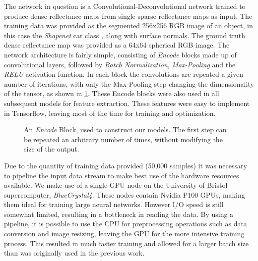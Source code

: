 \documentclass[ %
                    author={Gavin Parker},
                supervisor={Dr. Neill Campbell},
                    degree={MEng},
                     title={Deep Learning for Illumination Estimation from Stereo Images},
                  subtitle={},
                      type={Research},
                      year={2018} ]{dissertation}
\begin{document}
The network in question is a Convolutional-Deconvolutional network trained to produce dense reflectance maps from single sparse reflectance maps as input. The training data was provided as the segmented 256x256 RGB image of an object, in this case the \textit{Shapenet} car class \cite{DBLP:journals/corr/ChangFGHHLSSSSX15}, along with surface normals. The ground truth dense reflectance map was provided as a 64x64 spherical RGB image.
\newline
The network architecture is fairly simple, consisting of \textit{Encode} blocks made up of convolutional layers, followed by \textit{Batch Normalization}, \textit{Max-Pooling} and the \textit{RELU} activation function. In each block the convolutions are repeated a given number of iterations, with only the Max-Pooling step changing the dimensionality of the tensor, as shown in \ref{fig:encode}. These Encode blocks were also used in all subsequent models for feature extraction. These features were easy to implement in Tensorflow, leaving most of the time for training and optimization.
\begin{figure}[H]
\centering
{}

\caption{An \textit{Encode} Block, used to construct our models. The first step can be repeated an arbitrary number of times, without modifying the size of the output.}
\label{fig:encode}
\end{figure}

Due to the quantity of training data provided (50,000 samples) it was necessary to pipeline the input data stream to make best use of the hardware resources available. We make use of a single GPU node on the University of Bristol supercomputer, \textit{BlueCrystal4}. These nodes contain Nvidia P100 GPUs, making them ideal for training large neural networks. However I/O speed is still somewhat limited, resulting in a bottleneck in reading the data. By using a pipeline, it is possible to use the CPU for preprocessing operations such as data conversion and image resizing, leaving the GPU for the more intensive training process. This resulted in much faster training and allowed for a larger batch size than was originally used in the previous work.
\end{document}
